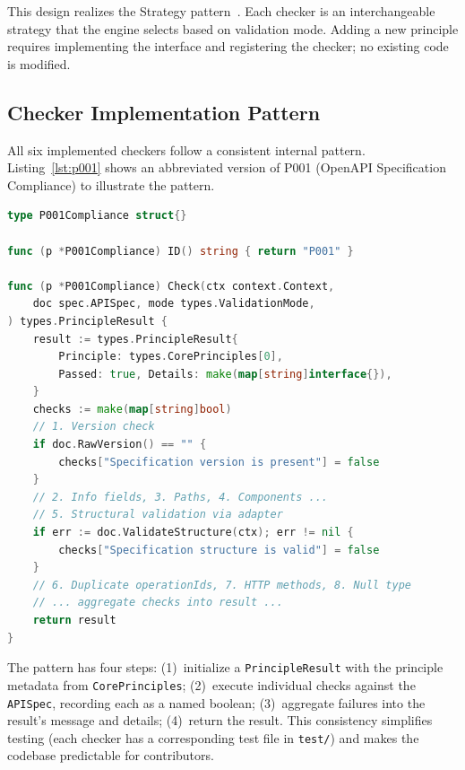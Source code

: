 This design realizes the Strategy pattern~\cite{gof}. Each checker is an interchangeable strategy that the engine selects based on validation mode. Adding a new principle requires implementing the interface and registering the checker; no existing code is modified.

\subsection{Checker Implementation Pattern}
\label{subsec:checker-implementation}

All six implemented checkers follow a consistent internal pattern. Listing~\ref{lst:p001} shows an abbreviated version of P001 (OpenAPI Specification Compliance) to illustrate the pattern.

\begin{lstlisting}[language=Go,caption={P001 checker pattern (abbreviated, \texttt{principles/p001\_compliance.go}).},label={lst:p001}]
type P001Compliance struct{}

func (p *P001Compliance) ID() string { return "P001" }

func (p *P001Compliance) Check(ctx context.Context,
    doc spec.APISpec, mode types.ValidationMode,
) types.PrincipleResult {
    result := types.PrincipleResult{
        Principle: types.CorePrinciples[0],
        Passed: true, Details: make(map[string]interface{}),
    }
    checks := make(map[string]bool)
    // 1. Version check
    if doc.RawVersion() == "" {
        checks["Specification version is present"] = false
    }
    // 2. Info fields, 3. Paths, 4. Components ...
    // 5. Structural validation via adapter
    if err := doc.ValidateStructure(ctx); err != nil {
        checks["Specification structure is valid"] = false
    }
    // 6. Duplicate operationIds, 7. HTTP methods, 8. Null type
    // ... aggregate checks into result ...
    return result
}
\end{lstlisting}

The pattern has four steps: (1)~initialize a \texttt{PrincipleResult} with the principle metadata from \texttt{CorePrinciples}; (2)~execute individual checks against the \texttt{APISpec}, recording each as a named boolean; (3)~aggregate failures into the result's message and details; (4)~return the result. This consistency simplifies testing (each checker has a corresponding test file in \texttt{test/}) and makes the codebase predictable for contributors.

